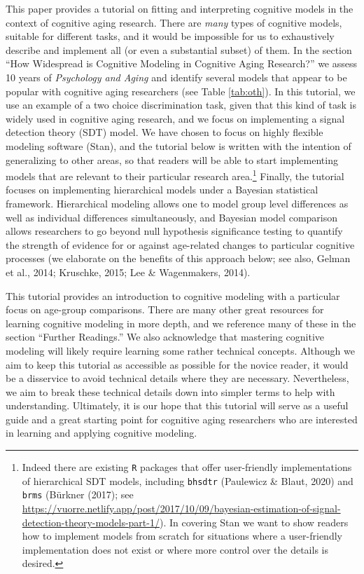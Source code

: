 \documentclass[
  english,
  ,man,floatsintext]{apa6}
\begin{document}
This paper provides a tutorial on fitting and interpreting cognitive models in the context of cognitive aging research. There are \emph{many} types of cognitive models, suitable for different tasks, and it would be impossible for us to exhaustively describe and implement all (or even a substantial subset) of them. In the section \enquote{How Widespread is Cognitive Modeling in Cognitive Aging Research?} we assess 10 years of \emph{Psychology and Aging} and identify several models that appear to be popular with cognitive aging researchers (see Table \ref{tab:oth}). In this tutorial, we use an example of a two choice discrimination task, given that this kind of task is widely used in cognitive aging research, and we focus on implementing a signal detection theory (SDT) model. We have chosen to focus on highly flexible modeling software (Stan), and the tutorial below is written with the intention of generalizing to other areas, so that readers will be able to start implementing models that are relevant to their particular research area.\footnote{Indeed there are existing \texttt{R} packages that offer user-friendly implementations of hierarchical SDT models, including \texttt{bhsdtr} (Paulewicz \& Blaut, 2020) and \texttt{brms} (Bürkner (2017); see \url{https://vuorre.netlify.app/post/2017/10/09/bayesian-estimation-of-signal-detection-theory-models-part-1/}). In covering Stan we want to show readers how to implement models from scratch for situations where a user-friendly implementation does not exist or where more control over the details is desired.} Finally, the tutorial focuses on implementing hierarchical models under a Bayesian statistical framework. Hierarchical modeling allows one to model group level differences as well as individual differences simultaneously, and Bayesian model comparison allows researchers to go beyond null hypothesis significance testing to quantify the strength of evidence for or against age-related changes to particular cognitive processes (we elaborate on the benefits of this approach below; see also, Gelman et al., 2014; Kruschke, 2015; Lee \& Wagenmakers, 2014).

This tutorial provides an introduction to cognitive modeling with a particular focus on age-group comparisons. There are many other great resources for learning cognitive modeling in more depth, and we reference many of these in the section \enquote{Further Readings.} We also acknowledge that mastering cognitive modeling will likely require learning some rather technical concepts. Although we aim to keep this tutorial as accessible as possible for the novice reader, it would be a disservice to avoid technical details where they are necessary. Nevertheless, we aim to break these technical details down into simpler terms to help with understanding. Ultimately, it is our hope that this tutorial will serve as a useful guide and a great starting point for cognitive aging researchers who are interested in learning and applying cognitive modeling.
\end{document}
